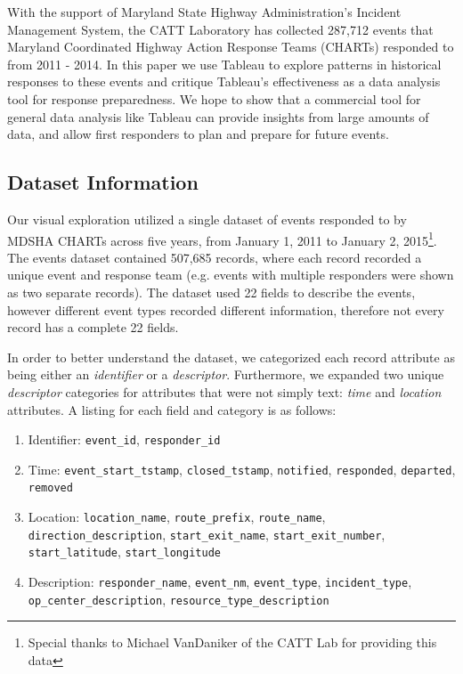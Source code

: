 \documentclass[11pt,letterpaper]{article}
\begin{document}
With the support of Maryland State Highway Administration's Incident Management System, the CATT Laboratory has collected 287,712 events that Maryland Coordinated Highway Action Response Teams (CHARTs) responded to from 2011 - 2014. In this paper we use Tableau \cite{mackinlay2007show} to explore patterns in historical responses to these events and critique Tableau's effectiveness as a data analysis tool for response preparedness. We hope to show that a commercial tool for general data analysis like Tableau can provide insights from large amounts of data, and allow first responders to plan and prepare for future events.

\subsection*{Dataset Information}

Our visual exploration utilized a single dataset of events responded to by MDSHA CHARTs across five years, from January 1, 2011 to January 2, 2015\footnote{Special thanks to Michael VanDaniker of the CATT Lab for providing this data}. The events dataset contained 507,685 records, where each record recorded a unique event and response team (e.g. events with multiple responders were shown as two separate records). The dataset used 22 fields to describe the events, however different event types recorded different information, therefore not every record has a complete 22 fields. 

In order to better understand the dataset, we categorized each record attribute as being either an \textit{identifier} or a \textit{descriptor}. Furthermore, we expanded two unique \textit{descriptor} categories for attributes that were not simply text: \textit{time} and \textit{location} attributes. A listing for each field and category is as follows:

\begin{enumerate}
	\item Identifier: \texttt{event\_id}, \texttt{responder\_id}
	\item Time: \texttt{event\_start\_tstamp}, \texttt{closed\_tstamp}, \texttt{notified}, \texttt{responded}, \texttt{departed}, \texttt{removed}
	\item Location: \texttt{location\_name}, \texttt{route\_prefix}, \texttt{route\_name}, \texttt{direction\_description}, \texttt{start\_exit\_name}, \texttt{start\_exit\_number}, \texttt{start\_latitude}, \texttt{start\_longitude}
	\item Description: \texttt{responder\_name}, \texttt{event\_nm}, \texttt{event\_type}, \texttt{incident\_type}, \texttt{op\_center\_description}, \texttt{resource\_type\_description}
\end{enumerate}
\end{document}
